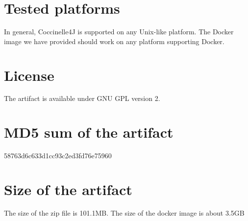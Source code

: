 \documentclass[a4paper,UKenglish]{darts-v2019}
\newenvironment{platforms}{\section{Tested platforms}}{}
\newcommand{\license}[1]{{\section{License}#1}}
\newcommand{\mdsum}[1]{{\section{MD5 sum of the artifact}#1}}
\newcommand{\artifactsize}[1]{{\section{Size of the artifact}#1}}
\begin{document}
\begin{platforms}
In general, Coccinelle4J is supported on any Unix-like platform. 
The Docker image we have provided should work on any platform supporting Docker.

\end{platforms}

\license{The artifact is available under GNU GPL version 2.}

\mdsum{58763d6c633d1cc93c2ed3fd76e75960}

\artifactsize{The size of the zip file is 101.1MB. The size of the docker image is about 3.5GB}












\end{document}
